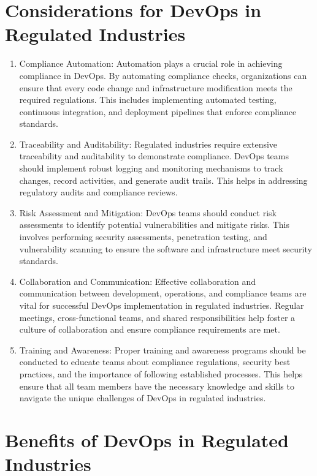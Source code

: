 \section*{Considerations for DevOps in Regulated Industries}
\begin{enumerate}

    \item Compliance Automation: Automation plays a crucial role in achieving compliance in DevOps. By automating compliance checks, organizations can ensure that every code change and infrastructure modification meets the required regulations. This includes implementing automated testing, continuous integration, and deployment pipelines that enforce compliance standards.

    \item Traceability and Auditability: Regulated industries require extensive traceability and auditability to demonstrate compliance. DevOps teams should implement robust logging and monitoring mechanisms to track changes, record activities, and generate audit trails. This helps in addressing regulatory audits and compliance reviews.

    \item Risk Assessment and Mitigation: DevOps teams should conduct risk assessments to identify potential vulnerabilities and mitigate risks. This involves performing security assessments, penetration testing, and vulnerability scanning to ensure the software and infrastructure meet security standards.

    \item Collaboration and Communication: Effective collaboration and communication between development, operations, and compliance teams are vital for successful DevOps implementation in regulated industries. Regular meetings, cross-functional teams, and shared responsibilities help foster a culture of collaboration and ensure compliance requirements are met.

    \item Training and Awareness: Proper training and awareness programs should be conducted to educate teams about compliance regulations, security best practices, and the importance of following established processes. This helps ensure that all team members have the necessary knowledge and skills to navigate the unique challenges of DevOps in regulated industries.
\end{enumerate}

\section*{Benefits of DevOps in Regulated Industries}


